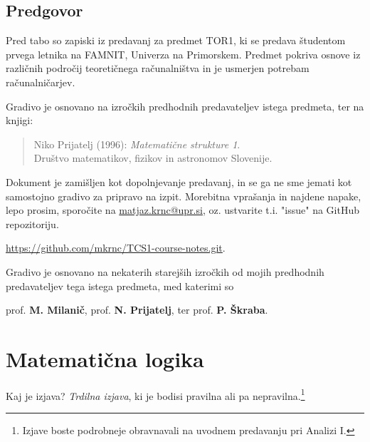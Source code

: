 \documentclass[11pt,paper=b5,DIV=13,headinclude,footinclude]{scrbook}
\begin{document}



\newpage
\section*{Predgovor}
Pred tabo so zapiski iz predavanj za predmet TOR1, ki se predava študentom prvega letnika na FAMNIT, Univerza na Primorskem.
Predmet pokriva osnove iz različnih področij teoretičnega računalništva in je usmerjen potrebam računalničarjev.

Gradivo je osnovano na izročkih  predhodnih predavateljev istega predmeta, ter na knjigi: 
\begin{quote}
   Niko Prijatelj (1996):
   \emph{Matematične strukture 1}.
   \\
   Društvo   matematikov,   fizikov in astronomov Slovenije. 
\end{quote}

Dokument je zamišljen kot dopolnjevanje predavanj, in se ga ne sme jemati kot samostojno gradivo za pripravo na izpit. 
Morebitna vprašanja in najdene napake, lepo prosim, sporočite na
\url{matjaz.krnc@upr.si}, oz. ustvarite t.i. "issue"\xspace na GitHub repozitoriju.
\begin{center}
    \url{https://github.com/mkrnc/TCS1-course-notes.git}.    
\end{center}

\medskip
Gradivo je osnovano na nekaterih starejših izročkih od mojih predhodnih predavateljev tega istega predmeta, med katerimi so 
\begin{center}
    prof. \textbf{M. Milanič}, 
    prof. \textbf{N. Prijatelj}, ter 
    prof. \textbf{P. Škraba}.
\end{center}




\tableofcontents


\chapter{Matematična logika}

Kaj je izjava? {\em Trdilna izjava}, ki je bodisi pravilna ali pa nepravilna.\footnote{Izjave boste podrobneje obravnavali na uvodnem predavanju pri Analizi I.}
\end{document}
